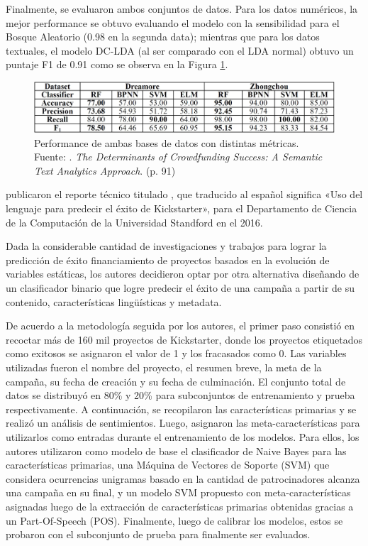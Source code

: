 Finalmente, se evaluaron ambos conjuntos de datos. Para los datos numéricos, la mejor performance se obtuvo evaluando el modelo con la sensibilidad para el Bosque Aleatorio (0.98 en la segunda data); mientras que para los datos textuales, el modelo DC-LDA (al ser comparado con el LDA normal) obtuvo un puntaje F1 de 0.91 como se observa en la Figura \ref{2:fig118}.

\begin{figure}[!ht]
	\begin{center}
		\includegraphics[width=1\textwidth]{2/figures/yuan2016b.jpg}
		\caption[Performance de ambas bases de datos con distintas métricas]{Performance de ambas bases de datos con distintas métricas.\\
			Fuente: \cite{pr_yuan2016textanalytics}. \textit{The Determinants of Crowdfunding Success: A Semantic Text Analytics Approach}. (p. 91)}
		\label{2:fig118}
	\end{center}
\end{figure}

\clearpage
\cite{pr_sawhney2016usingLT} publicaron el reporte técnico titulado , que traducido al español significa «Uso del lenguaje para predecir el éxito de Kickstarter», para el Departamento de Ciencia de la Computación de la Universidad Standford en el 2016.

Dada la considerable cantidad de investigaciones y trabajos para lograr la predicción de éxito financiamiento de proyectos basados en la evolución de variables estáticas, los autores decidieron optar por otra alternativa diseñando de un clasificador binario que logre predecir el éxito de una campaña a partir de su contenido, características lingüísticas y metadata.

De acuerdo a la metodología seguida por los autores, el primer paso consistió en recoctar más de 160 mil proyectos de Kickstarter, donde los proyectos etiquetados como exitosos se asignaron el valor de 1 y los fracasados como 0. Las variables utilizadas fueron el nombre del proyecto, el resumen breve, la meta de la campaña, su fecha de creación y su fecha de culminación. El conjunto total de datos se distribuyó en 80\% y 20\% para subconjuntos de entrenamiento y prueba respectivamente. A continuación, se recopilaron las características primarias y se realizó un análisis de sentimientos. Luego, asignaron las meta-características para utilizarlos como entradas durante el entrenamiento de los modelos. Para ellos, los autores utilizaron como modelo de base el clasificador de Naive Bayes para las características primarias, una Máquina de Vectores de Soporte (SVM) que considera ocurrencias unigramas basado en la cantidad de patrocinadores alcanza una campaña en su final, y un modelo SVM propuesto con meta-características asignadas luego de la extracción de características primarias obtenidas gracias a un Part-Of-Speech (POS). Finalmente, luego de calibrar los modelos, estos se probaron con el subconjunto de prueba para finalmente ser evaluados.

